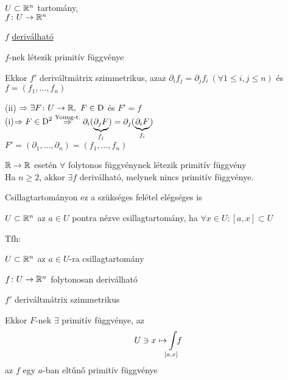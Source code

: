 \begin{te}
  $U\subset\mathbb{R}^n$ tartomány,\\$f\colon U\to\mathbb{R}^n$
  \begin{enumzjr}
    \item $f$ \underline{deriválható}
    \item $f$-nek létezik primitív függvénye
  \end{enumzjr}
  Ekkor $f'$ deriváltmátrix szimmetrikus, azaz $\partial_if_j=\partial_jf_i\ (\forall 1\leq i,j\leq n)$ és
  $f=(f_1,\dotsc,f_n)$
\end{te}

\begin{biz}(ii) $\nn \exists F\colon U\to\R,\ F\in\Der$ és $F'=f$\\
  (i)$\Rightarrow F\in\operatorname{D}^2\overset{\text{Young-t.}}{\Rightarrow} \partial_i(\underbrace{\partial_jF}_{f_j}) =
  \partial_j(\underbrace{\partial_iF}_{f_i})$\\
$F'=(\partial_1,\dotsc,\partial_n)=(f_1,\dotsc,f_n)$
\end{biz}

\begin{Megj}
\item $\mathbb{R}\to\mathbb{R}$ esetén $\forall$ folytonos függvénynek létezik primitív függvény\\
  Ha $n\geq 2$, akkor $\exists f$ deriválható, melynek nincs primitív függvénye.
\item Csillagtartományon ez a szükséges felétel elégséges is
\end{Megj}
\begin{de}[Csillagtartomány]
  $U\subset \mathbb{R}^n$ az $a\in U$ pontra nézve csillagtartomány, ha $\forall x\in U: [a,x]\subset U$
\end{de}

\begin{te}
  Tfh:
  \begin{enumzjr}
  \item $U\subset \mathbb{R}^n$ az $a\in U$-ra csillagtartomány
  \item $f\colon U\to\mathbb{R}^n$ folytonosan deriválható
  \item $f'$ deriváltmátrix szimmetrikus
  \end{enumzjr}
  Ekkor $F$-nek $\exists$ primitív függvénye, az
  \[\di U\owns x\mapsto\!\!\Int_{[a,x]}\!\!\!f\]
  az  $f$ egy $a$-ban eltűnő primitív függvénye
\end{te}


